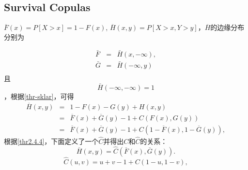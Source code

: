 \subsection{Survival Copulas}
$\overline{F}(x) = P[X>x] = 1- F(x)$, $\overline{H}(x,y) = P[X>x,Y>y]$，$\overline{H}$的边缘分布分别为

\begin{eqnarray}
    \bar{F} &=& \bar{H}(x, -\infty), \\
    \bar{G} &=& \bar{H}(-\infty,y) \\
    \label{eq-survivalmarginal}
\end{eqnarray}
且
\begin{equation}
    \bar{H}(-\infty,-\infty) = 1
    \label{eq-survivaljoint}
\end{equation}
，根据\cref{thr-sklar}，可得
\begin{eqnarray*}
    \overline{H}(x,y) &=& 1-F(x)-G(y)+H(x,y) \\
    &=&\overline{F}(x)+\overline{G}(y)-1+C(F(x),G(y)) \\
    &=&\overline{F}(x)+\overline{G}(y)-1+C(1-\overline{F}(x),1-\overline{G}(y)),
\end{eqnarray*}
根据\cref{thr2.4.4}，下面定义了一个$\hat{C}$并得出$C$和$\hat{C}$的关系：
\begin{equation}
    \overline{H}(x,y) = \hat{C}(\overline{F}(x),\overline{G}(y)).
    \label{eq2.6.2}
\end{equation}
\begin{equation}
    \hat{C}(u,v) = u+v-1+C(1-u,1-v),
    \label{eq2.6.1}
\end{equation}

